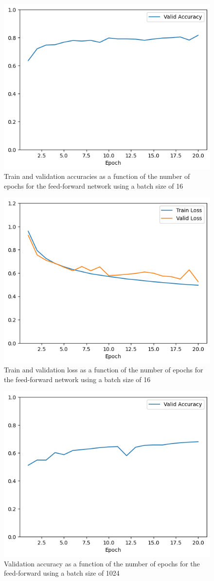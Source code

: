 \documentclass[12pt]{article}
\begin{document}
\begin{itemize}
          \begin{figure}[H]
              \centering
              \includegraphics[width=0.5\linewidth]{../outputs/hw1-q2-2a-acc-16.png}
              \caption{Train and validation accuracies as a function of the number of epochs for the feed-forward network using a batch size of 16}
              \label{fig:2.2a:acc:16}
          \end{figure}

          \begin{figure}[H]
              \centering
              \includegraphics[width=0.5\linewidth]{../outputs/hw1-q2-2a-loss-16.png}
              \caption{Train and validation loss as a function of the number of epochs for the feed-forward network using a batch size of 16}
              \label{fig:2.2a:loss:16}
          \end{figure}

          \begin{figure}[H]
              \centering
              \includegraphics[width=0.5\linewidth]{../outputs/hw1-q2-2a-acc-1024.png}
              \caption{Validation accuracy as a function of the number of epochs for the feed-forward using a batch size of 1024}
              \label{fig:2.2a:acc:1024}
          \end{figure}


\end{itemize}
\end{document}
